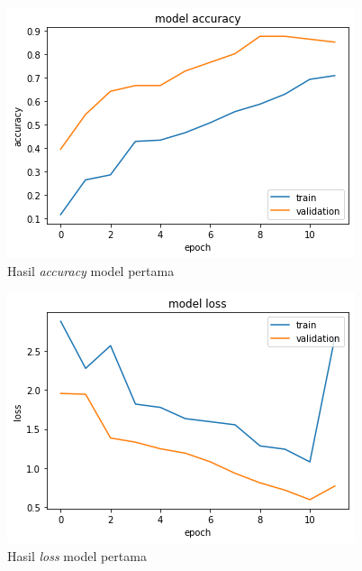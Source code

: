 \begin{figure}[H]
  \centering

  \includegraphics[scale=0.75]{gambar/bab4-uji-model-worst-acc.png}

  \caption{Hasil \emph{accuracy} model pertama}
  \label{fig:model1-train-acc}
\end{figure}

\begin{figure}[H]
  \centering

  \includegraphics[scale=0.75]{gambar/bab4-uji-model-worst-loss.png}

  \caption{Hasil \emph{loss} model pertama}
  \label{fig:model1-train-loss}
\end{figure}

